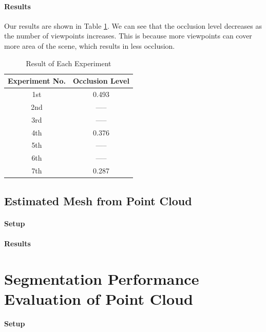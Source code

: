 \documentclass[11pt, a4paper,oneside,chapterprefix=false]{scrbook}
\begin{document}
\paragraph{Results}

Our results are shown in Table \ref{tab:result of each experiment}. We can see that the occlusion level decreases as the number of viewpoints increases. This is because more viewpoints can cover more area of the scene, which results in less occlusion.

\begin{table}[h]
    \centering
    \begin{tabular}{|c|c|}
        \hline
        \textbf{Experiment No.} & \textbf{Occlusion Level} \\
        \hline
        1st & 0.493 \\
        2nd & ----- \\
		3rd & ----- \\
		4th & 0.376 \\
		5th & ----- \\
		6th & ----- \\
		7th & 0.287 \\
        \hline
    \end{tabular}
    \caption{Result of Each Experiment}
    \label{tab:result of each experiment}
\end{table}

\subsection{Estimated Mesh from Point Cloud}

\paragraph{Setup}

\paragraph{Results}

\section{Segmentation Performance Evaluation of Point Cloud}

\paragraph{Setup}
\end{document}

